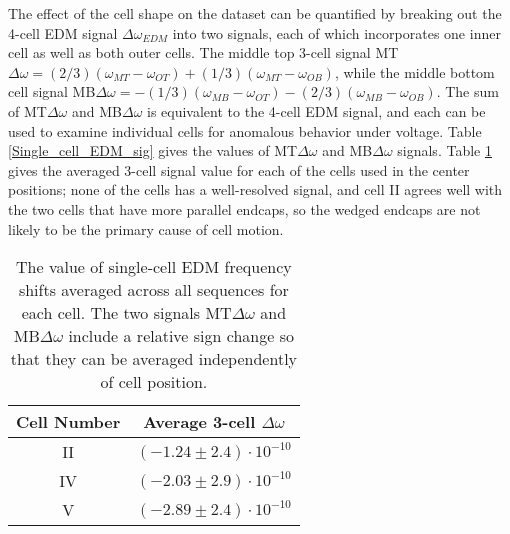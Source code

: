 \documentclass [10pt, twoside] {uwthesis}[2012/04/02]
\begin{document}
The effect of the cell shape on the dataset can be quantified by breaking out the 4-cell EDM signal $\Delta\omega_{EDM}$ into two signals, each of which incorporates one inner cell as well as both outer cells. The middle top 3-cell signal MT$\Delta\omega = (2/3)(\omega_{MT}-\omega_{OT}) + (1/3)(\omega_{MT}-\omega_{OB})$, while the middle bottom cell signal MB$\Delta\omega = -(1/3)(\omega_{MB}-\omega_{OT}) - (2/3)(\omega_{MB}-\omega_{OB})$. The sum of MT$\Delta\omega$ and MB$\Delta\omega$ is equivalent to the 4-cell EDM signal, and each can be used to examine individual cells for anomalous behavior under voltage. Table \ref{Single_cell_EDM_sig} gives the values of MT$\Delta\omega$ and MB$\Delta\omega$ signals. Table \ref{Single_cell_EDM_AVG} gives the averaged 3-cell signal value for each of the cells used in the center positions; none of the cells has a well-resolved signal, and cell II agrees well with the two cells that have more parallel endcaps, so the wedged endcaps are not likely to be the primary cause of cell motion.

\begin{table}[ht]
\begin{center} 																				
\caption[Average HV frequency shift by cell] 
{\narrower The value of single-cell EDM frequency shifts averaged across all sequences for each cell. The two signals MT$\Delta\omega$ and MB$\Delta\omega$ include a relative sign change so that they can be averaged independently of cell position.} \label{Single_cell_EDM_AVG}	
\begin{tabular}{cc}
\hline \hline 
Cell Number & Average 3-cell $\Delta\omega$ \\ [0.5ex]	
\hline     
II&$(-1.24\pm 2.4)\cdot10^{-10}$\\
IV&$(-2.03\pm 2.9)\cdot10^{-10}$\\
V&$(-2.89\pm 2.4)\cdot10^{-10}$\\          		
[1ex]	
\hline
\end{tabular}
\end{center} 														
\end{table}
\end{document}
